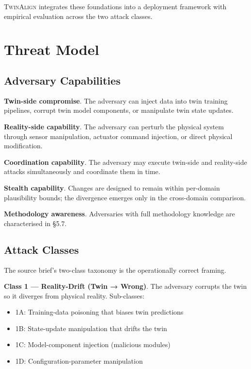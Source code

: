 \documentclass[sigconf,nonacm]{acmart}
\begin{document}
\textsc{TwinAlign} integrates these foundations into a deployment
framework with empirical evaluation across the two attack classes.

\section{Threat Model}

\subsection{Adversary Capabilities}

\textbf{Twin-side compromise}. The adversary can inject data into
twin training pipelines, corrupt twin model components, or
manipulate twin state updates.

\textbf{Reality-side capability}. The adversary can perturb the
physical system through sensor manipulation, actuator command
injection, or direct physical modification.

\textbf{Coordination capability}. The adversary may execute
twin-side and reality-side attacks simultaneously and coordinate
them in time.

\textbf{Stealth capability}. Changes are designed to remain within
per-domain plausibility bounds; the divergence emerges only in
the cross-domain comparison.

\textbf{Methodology awareness}. Adversaries with full methodology
knowledge are characterised in §5.7.

\subsection{Attack Classes}

The source brief's two-class taxonomy is the operationally correct
framing.

\textbf{Class 1 --- Reality-Drift (Twin → Wrong)}. The adversary
corrupts the twin so it diverges from physical reality. Sub-classes:

\begin{itemize}
  \item 1A: Training-data poisoning that biases twin predictions
  \item 1B: State-update manipulation that drifts the twin
  \item 1C: Model-component injection (malicious modules)
  \item 1D: Configuration-parameter manipulation
\end{itemize}
\end{document}
